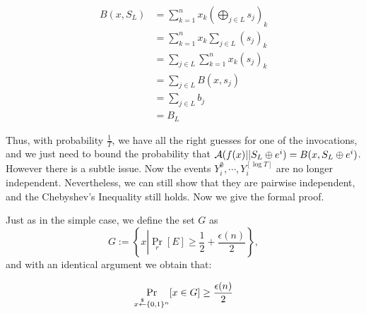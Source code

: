 \begin{align*}
B(x,S_L) &= \sum_{k=1}^n x_k (\bigoplus_{j \in L} s_j)_k \\ 
         &=  \sum_{k=1}^n x_k \sum_{j \in L} \left(s_j\right)_k \\
         &= \sum_{j \in L} \sum_{k=1}^n x_k (s_j)_k \\
         &= \sum_{j \in L} B(x,s_j) \\
         &= \sum_{j\in L} b_j  \\
         &= B_L
\end{align*}

Thus, with probability $\frac{1}{T}$, we have all the right guesses for one of the invocations, and we just need to bound the probability that $\mathcal{A}(f(x) || S_L \oplus e^i) = B(x, S_L \oplus e^i)$.
However there is a subtle issue. Now the events $Y_i^\emptyset, \cdots, Y_i^{[\log T]}$ are no longer independent.
Nevertheless, we can still show that they are pairwise independent, and the Chebyshev's Inequality still holds. Now we give the formal proof.

Just as in the simple case, we define the set $G$ as
$$G := \left\{x \left| \Pr_r \left[ E \right]\geq \frac{1}{2} + \frac{\epsilon(n)}{2} \right. \right\},$$
and with an identical argument we obtain that:

$$\Pr_{x \stackrel{\$}{\leftarrow} \{0,1\}^{n}}[x \in G] \geq \frac{\epsilon(n)}{2}$$


